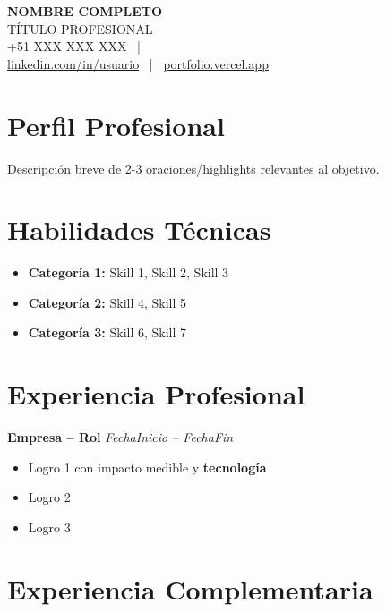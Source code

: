 \documentclass[11pt,a4paper]{article}
\begin{document}
\begin{center}
    {\Large \textbf{NOMBRE COMPLETO}} \\[-2pt]
    \textcolor{secondary}{TÍTULO PROFESIONAL} \\[4pt]
    +51 XXX XXX XXX \ | \
     \\[-2pt]
    \href{https://linkedin.com/in/usuario}{linkedin.com/in/usuario} \ | \
    \href{https://portfolio.vercel.app}{portfolio.vercel.app}
\end{center}

\section*{Perfil Profesional}

Descripción breve de 2-3 oraciones/highlights relevantes al objetivo.

\section*{Habilidades Técnicas}

\begin{itemize}
  \item \textbf{Categoría 1:} Skill 1, Skill 2, Skill 3
  \item \textbf{Categoría 2:} Skill 4, Skill 5
  \item \textbf{Categoría 3:} Skill 6, Skill 7
\end{itemize}

\section*{Experiencia Profesional}

\noindent
\textbf{Empresa – Rol} \hfill \textit{FechaInicio – FechaFin}
\begin{itemize}
  \item Logro 1 con impacto medible y \textbf{tecnología}
  \item Logro 2
  \item Logro 3
\end{itemize}

\section*{Experiencia Complementaria}
\end{document}
